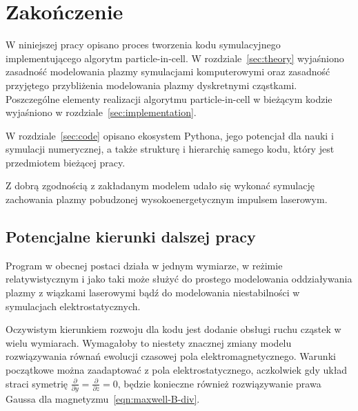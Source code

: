 \section[Zakończenie]{Zakończenie}\label{sec:ending} %

W niniejszej pracy opisano proces tworzenia kodu symulacyjnego implementującego
algorytm particle-in-cell. W rozdziale~\ref{sec:theory} wyjaśniono zasadność modelowania plazmy symulacjami komputerowymi oraz zasadność przyjętego przybliżenia
modelowania plazmy dyskretnymi cząstkami. Poszczególne elementy realizacji algorytmu particle-in-cell w bieżącym kodzie wyjaśniono w rozdziale~\ref{sec:implementation}.

W rozdziale~\ref{sec:code} opisano ekosystem Pythona, jego potencjał dla nauki i symulacji numerycznej, a także strukturę i hierarchię samego kodu, który jest przedmiotem bieżącej pracy.

Z dobrą zgodnością z zakładanym modelem udało się wykonać symulację zachowania plazmy pobudzonej wysokoenergetycznym impulsem laserowym. %


\subsection{Potencjalne kierunki dalszej pracy}

Program w obecnej postaci działa w jednym wymiarze, w reżimie relatywistycznym i jako taki może służyć do prostego modelowania oddziaływania plazmy z wiązkami laserowymi
bądź do modelowania niestabilności w symulacjach elektrostatycznych.

Oczywistym kierunkiem rozwoju dla kodu jest dodanie obsługi ruchu cząstek w wielu wymiarach. Wymagałoby to niestety znacznej zmiany modelu rozwiązywania równań ewolucji czasowej pola elektromagnetycznego.
Warunki początkowe można zaadaptować z pola elektrostatycznego, aczkolwiek gdy układ straci symetrię $\frac{\partial}{\partial y} = \frac{\partial}{\partial z} = 0$, będzie konieczne również rozwiązywanie
prawa Gaussa dla magnetyzmu~\ref{eqn:maxwell-B-div}.

